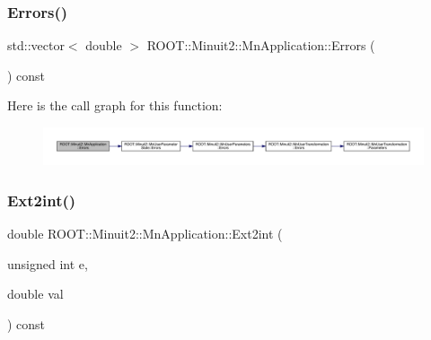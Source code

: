 \mbox{\label{classROOT_1_1Minuit2_1_1MnApplication_a2a4c39064eb247a464476b6309816282}} 
\subsubsection{\texorpdfstring{Errors()}{Errors()}\hspace{0.1cm}{\footnotesize\ttfamily [3/3]}}
{\footnotesize\ttfamily std\+::vector$<$ double $>$ R\+O\+O\+T\+::\+Minuit2\+::\+Mn\+Application\+::\+Errors (\begin{DoxyParamCaption}{ }\end{DoxyParamCaption}) const}

Here is the call graph for this function\+:
\nopagebreak
\begin{figure}[H]
\begin{center}
\leavevmode
\includegraphics[width=350pt]{df/dd5/classROOT_1_1Minuit2_1_1MnApplication_a2a4c39064eb247a464476b6309816282_cgraph}
\end{center}
\end{figure}
\mbox{\label{classROOT_1_1Minuit2_1_1MnApplication_a8c9379939f201ea95f32a2f1de575fca}} 
\subsubsection{\texorpdfstring{Ext2int()}{Ext2int()}\hspace{0.1cm}{\footnotesize\ttfamily [1/3]}}
{\footnotesize\ttfamily double R\+O\+O\+T\+::\+Minuit2\+::\+Mn\+Application\+::\+Ext2int (\begin{DoxyParamCaption}\item[{unsigned int}]{e,  }\item[{double}]{val }\end{DoxyParamCaption}) const}

